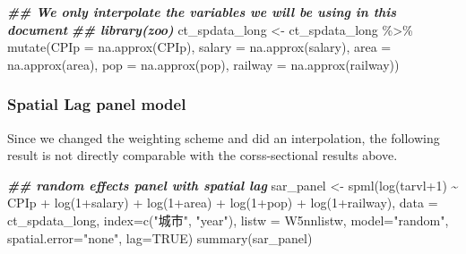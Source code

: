 \documentclass[
]{article}
\newenvironment{Shaded}{\begin{snugshade}}{\end{snugshade}}
\newcommand{\AttributeTok}[1]{\textcolor[rgb]{0.77,0.63,0.00}{#1}}
\newcommand{\ConstantTok}[1]{\textcolor[rgb]{0.00,0.00,0.00}{#1}}
\newcommand{\DecValTok}[1]{\textcolor[rgb]{0.00,0.00,0.81}{#1}}
\newcommand{\DocumentationTok}[1]{\textcolor[rgb]{0.56,0.35,0.01}{\textbf{\textit{#1}}}}
\newcommand{\FunctionTok}[1]{\textcolor[rgb]{0.00,0.00,0.00}{#1}}
\newcommand{\NormalTok}[1]{#1}
\newcommand{\OtherTok}[1]{\textcolor[rgb]{0.56,0.35,0.01}{#1}}
\newcommand{\SpecialCharTok}[1]{\textcolor[rgb]{0.00,0.00,0.00}{#1}}
\newcommand{\StringTok}[1]{\textcolor[rgb]{0.31,0.60,0.02}{#1}}
\begin{document}
\begin{Shaded}
\begin{Highlighting}[]
\DocumentationTok{\#\# We only interpolate the variables we will be using in this document}
\DocumentationTok{\#\# library(zoo)}
\NormalTok{ct\_spdata\_long }\OtherTok{\textless{}{-}}\NormalTok{ ct\_spdata\_long }\SpecialCharTok{\%\textgreater{}\%}
        \FunctionTok{mutate}\NormalTok{(}\AttributeTok{CPIp =} \FunctionTok{na.approx}\NormalTok{(CPIp), }\AttributeTok{salary =} \FunctionTok{na.approx}\NormalTok{(salary), }\AttributeTok{area =} \FunctionTok{na.approx}\NormalTok{(area), }\AttributeTok{pop =} \FunctionTok{na.approx}\NormalTok{(pop), }\AttributeTok{railway =} \FunctionTok{na.approx}\NormalTok{(railway))}
\end{Highlighting}
\end{Shaded}

\hypertarget{spatial-lag-panel-model}{%
\subsubsection{Spatial Lag panel model}\label{spatial-lag-panel-model}}

Since we changed the weighting scheme and did an interpolation, the
following result is not directly comparable with the corss-sectional
results above.

\begin{Shaded}
\begin{Highlighting}[]
\DocumentationTok{\#\# random effects panel with spatial lag}
\NormalTok{sar\_panel }\OtherTok{\textless{}{-}} \FunctionTok{spml}\NormalTok{(}\FunctionTok{log}\NormalTok{(tarvl}\SpecialCharTok{+}\DecValTok{1}\NormalTok{) }\SpecialCharTok{\textasciitilde{}}\NormalTok{ CPIp }\SpecialCharTok{+}
                \FunctionTok{log}\NormalTok{(}\DecValTok{1}\SpecialCharTok{+}\NormalTok{salary) }\SpecialCharTok{+}
                \FunctionTok{log}\NormalTok{(}\DecValTok{1}\SpecialCharTok{+}\NormalTok{area) }\SpecialCharTok{+} \FunctionTok{log}\NormalTok{(}\DecValTok{1}\SpecialCharTok{+}\NormalTok{pop) }\SpecialCharTok{+}
                \FunctionTok{log}\NormalTok{(}\DecValTok{1}\SpecialCharTok{+}\NormalTok{railway),}
               \AttributeTok{data =}\NormalTok{ ct\_spdata\_long,}
               \AttributeTok{index=}\FunctionTok{c}\NormalTok{(}\StringTok{"城市"}\NormalTok{, }\StringTok{"year"}\NormalTok{),}
               \AttributeTok{listw =}\NormalTok{ W5nnlistw,}
               \AttributeTok{model=}\StringTok{"random"}\NormalTok{, }
               \AttributeTok{spatial.error=}\StringTok{"none"}\NormalTok{, }
               \AttributeTok{lag=}\ConstantTok{TRUE}\NormalTok{)}
\FunctionTok{summary}\NormalTok{(sar\_panel)}
\end{Highlighting}
\end{Shaded}
\end{document}
